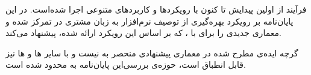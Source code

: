 
فرآیند  از اولین پیدایش تا کنون با رویکرد‌ها و کاربردهای
متنوعی اجرا شده‌است. در این پایان‌نامه بر رویکرد
بهره‌گیری از توصیف نرم‌افزار به زبان مشتری در  تمرکز شده و
معماری‌ جدیدی را برای  با  ، که بر اساس این
رویکرد ارائه شده، پیشنهاد می‌کند.

گرچه ایده‌ی مطرح شده در معماری پیشنهادی منحصر به  
 نیست و با سایر  ‌ها و ‌ها نیز قابل انطباق است،
حوزه‌ی بررسی‌این پایان‌نامه به   محدود شده
است.





